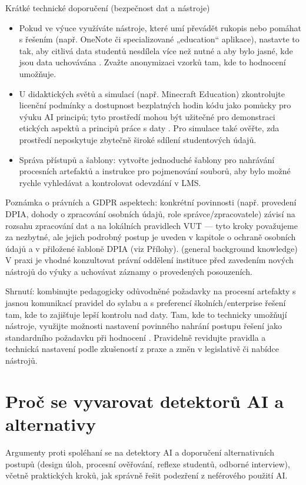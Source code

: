 \documentclass{report}%
\begin{document}
Krátké technické doporučení (bezpečnost dat a nástroje)
\begin{itemize}
  \item Pokud ve výuce využíváte nástroje, které umí převádět rukopis nebo pomáhat s řešením (např. OneNote či specializované „education“ aplikace), nastavte to tak, aby citlivá data studentů nesdílela více než nutné a aby bylo jasné, kde jsou data uchovávána \cite{kb_ai_101_tipu_pdf_04e4a115_page_8_1, kb_ai_101_tipu_pdf_04e4a115_page_14_1}. Zvažte anonymizaci vzorků tam, kde to hodnocení umožňuje.
  \item U didaktických světů a simulací (např. Minecraft Education) zkontrolujte licenční podmínky a dostupnost bezplatných hodin kódu jako pomůcky pro výuku AI principů; tyto prostředí mohou být užitečné pro demonstraci etických aspektů a principů práce s daty \cite{kb_ai_101_tipu_pdf_04e4a115_page_15_2}. Pro simulace také ověřte, zda prostředí neposkytuje zbytečně široké sdílení studentových údajů.
  \item Správa přístupů a šablony: vytvořte jednoduché šablony pro nahrávání procesních artefaktů a instrukce pro pojmenování souborů, aby bylo možné rychle vyhledávat a kontrolovat odevzdání v LMS.
\end{itemize}

Poznámka o právních a GDPR aspektech: konkrétní povinnosti (např. provedení DPIA, dohody o zpracování osobních údajů, role správce/zpracovatele) závisí na rozsahu zpracování dat a na lokálních pravidlech VUT — tyto kroky považujeme za nezbytné, ale jejich podrobný postup je uveden v kapitole o ochraně osobních údajů a v přiložené šabloně DPIA (viz Přílohy). (general background knowledge) V praxi je vhodné konzultovat právní oddělení instituce před zavedením nových nástrojů do výuky a uchovávat záznamy o provedených posouzeních.

Shrnutí: kombinujte pedagogicky odůvodněné požadavky na procesní artefakty s jasnou komunikací pravidel do sylabu a s preferencí školních/enterprise řešení tam, kde to zajišťuje lepší kontrolu nad daty. Tam, kde to technicky umožňují nástroje, využijte možnosti nastavení povinného nahrání postupu řešení jako standardního požadavku při hodnocení \cite{kb_ai_101_tipu_pdf_04e4a115_page_8_1}. Pravidelně revidujte pravidla a technická nastavení podle zkušeností z praxe a změn v legislativě či nabídce nástrojů.%

%
\section{Proč se vyvarovat detektorů AI a alternativy}%
Argumenty proti spoléhaní se na detektory AI a doporučení alternativních postupů (design úloh, procesní ověřování, reflexe studentů, odborné interview), včetně praktických kroků, jak správně řešit podezření z neférového použití AI.%
\end{document}

